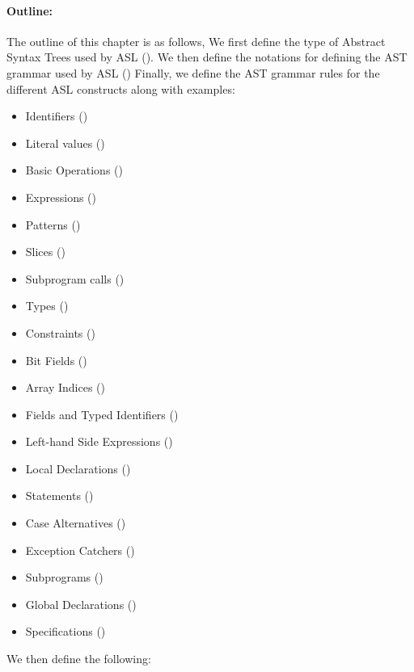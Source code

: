\paragraph{Outline:}
The outline of this chapter is as follows,
We first define the type of Abstract Syntax Trees used by ASL ().
We then define the notations for defining the AST grammar used by ASL ()
Finally, we define the AST grammar rules for the different ASL constructs along with examples:
\begin{itemize}
  \item Identifiers ()
  \item Literal values ()
  \item Basic Operations ()
  \item Expressions ()
  \item Patterns ()
  \item Slices ()
  \item Subprogram calls ()
  \item Types ()
  \item Constraints ()
  \item Bit Fields ()
  \item Array Indices ()
  \item Fields and Typed Identifiers ()
  \item Left-hand Side Expressions ()
  \item Local Declarations ()
  \item Statements ()
  \item Case Alternatives ()
  \item Exception Catchers ()
  \item Subprograms ()
  \item Global Declarations ()
  \item Specifications ()
\end{itemize}
We then define the following:
